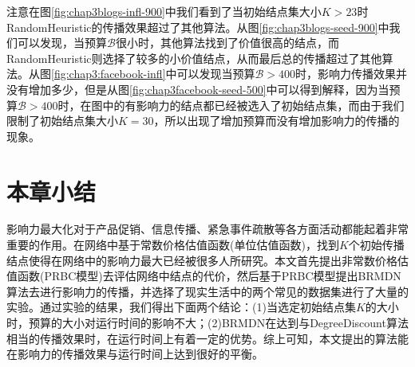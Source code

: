 注意在图\ref{fig:chap3blogs-infl-900}中我们看到了当初始结点集大小$K>23$时RandomHeuristic的传播效果超过了其他算法。从图\ref{fig:chap3blogs-seed-900}中我们可以发现，当预算$\mathcal{B}$很小时，其他算法找到了价值很高的结点，而RandomHeuristic则选择了较多的小价值结点，从而最后总的传播超过了其他算法。从图\ref{fig:chap3:facebook-infl}中可以发现当预算$\mathcal{B}>400$时，影响力传播效果并没有增加多少，但是从图\ref{fig:chap3facebook-seed-500}中可以得到解释，因为当预算$\mathcal{B}>400$时，在图中的有影响力的结点都已经被选入了初始结点集，而由于我们限制了初始结点集大小$K=30$，所以出现了增加预算而没有增加影响力的传播的现象。


\section{本章小结}
影响力最大化对于产品促销、信息传播、紧急事件疏散等各方面活动都能起着非常重要的作用。在网络中基于常数价格估值函数(单位估值函数)，找到$K$个初始传播结点使得在网络中的影响力最大已经被很多人所研究。本文首先提出非常数价格估值函数(PRBC模型)去评估网络中结点的代价，然后基于PRBC模型提出BRMDN算法去进行影响力的传播，并选择了现实生活中的两个常见的数据集进行了大量的实验。通过实验的结果，我们得出下面两个结论：(1)当选定初始结点集$K$的大小时，预算的大小对运行时间的影响不大；(2)BRMDN在达到与DegreeDiscount算法相当的传播效果时，在运行时间上有着一定的优势。综上可知，本文提出的算法能在影响力的传播效果与运行时间上达到很好的平衡。